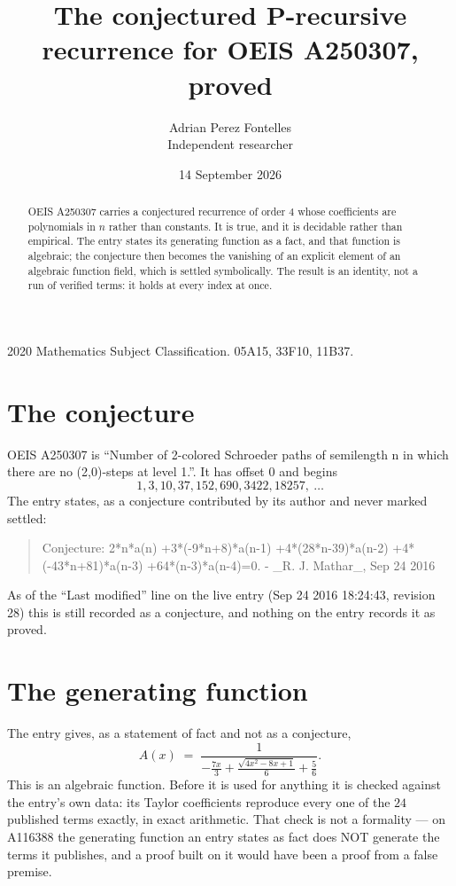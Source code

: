 \documentclass[11pt,a4paper]{article}
\title{The conjectured P-recursive recurrence for OEIS A250307, proved}
\author{Adrian Perez Fontelles\\ \small Independent researcher}
\date{14 September 2026}
\theoremstyle{plain}
\theoremstyle{definition}
\begin{document}
\maketitle

\begin{abstract}
OEIS A250307 carries a conjectured recurrence of order $4$ whose coefficients are polynomials in
$n$ rather than constants. It is true, and it is decidable rather than empirical. The entry
states its generating function as a fact, and that function is algebraic; the conjecture then
becomes the vanishing of an explicit element of an algebraic function field, which is settled
symbolically. The result is an identity, not a run of verified terms: it holds at every index
at once.
\end{abstract}

\noindent\small 2020 Mathematics Subject Classification. 05A15, 33F10, 11B37.\normalsize

\section{The conjecture}

OEIS A250307 is ``Number of 2-colored Schroeder paths of semilength n in which there are no (2,0)-steps at level 1.''. It has offset $0$ and begins
\[
1, 3, 10, 37, 152, 690, 3422, 18257,\ \dots
\]
The entry states, as a conjecture contributed by its author and never marked settled:
\begin{quote}\raggedright\small
Conjecture: 2*n*a(n) +3*(-9*n+8)*a(n-1) +4*(28*n-39)*a(n-2) +4*(-43*n+81)*a(n-3) +64*(n-3)*a(n-4)=0. - \_R. J. Mathar\_, Sep 24 2016
\end{quote}
As of the ``Last modified'' line on the live entry (Sep 24 2016 18:24:43, revision 28)
this is still recorded as a conjecture, and nothing on the entry records it as proved.

\section{The generating function}

The entry gives, as a statement of fact and not as a conjecture,
\[
A(x)\;=\;\frac{1}{- \frac{7 x}{3} + \frac{\sqrt{4 x^{2} - 8 x + 1}}{6} + \frac{5}{6}} .
\]
This is an algebraic function. Before it is used for anything it is checked against the entry's
own data: its Taylor coefficients reproduce every one of the $24$ published terms
exactly, in exact arithmetic. That check is not a formality --- on A116388 the generating
function an entry states as fact does NOT generate the terms it publishes, and a proof built on
it would have been a proof from a false premise.
\end{document}
